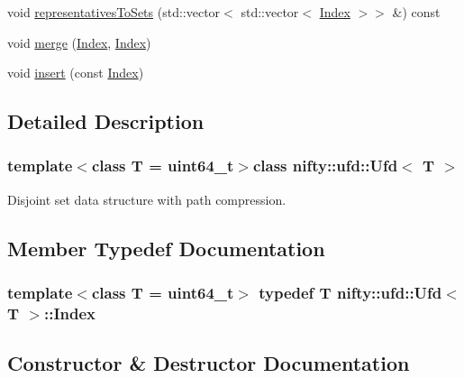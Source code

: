 \begin{DoxyCompactItemize}
\item 
void \hyperlink{classnifty_1_1ufd_1_1Ufd_af8d63d613aa1eb6efcd9770d9df0175c}{representatives\+To\+Sets} (std\+::vector$<$ std\+::vector$<$ \hyperlink{classnifty_1_1ufd_1_1Ufd_a0a9a7ab02b6d77fb2035234cbda8b3a7}{Index} $>$$>$ \&) const 
\item 
void \hyperlink{classnifty_1_1ufd_1_1Ufd_aeb49fa316c1956ce636e68e96e003d2f}{merge} (\hyperlink{classnifty_1_1ufd_1_1Ufd_a0a9a7ab02b6d77fb2035234cbda8b3a7}{Index}, \hyperlink{classnifty_1_1ufd_1_1Ufd_a0a9a7ab02b6d77fb2035234cbda8b3a7}{Index})
\item 
void \hyperlink{classnifty_1_1ufd_1_1Ufd_a89f525ed27ef959ff30666daa13741fe}{insert} (const \hyperlink{classnifty_1_1ufd_1_1Ufd_a0a9a7ab02b6d77fb2035234cbda8b3a7}{Index})
\end{DoxyCompactItemize}


\subsection{Detailed Description}
\subsubsection*{template$<$class T = uint64\+\_\+t$>$class nifty\+::ufd\+::\+Ufd$<$ T $>$}

Disjoint set data structure with path compression. 

\subsection{Member Typedef Documentation}
\hypertarget{classnifty_1_1ufd_1_1Ufd_a0a9a7ab02b6d77fb2035234cbda8b3a7}{}
\subsubsection[{Index}]{\setlength{\rightskip}{0pt plus 5cm}template$<$class T = uint64\+\_\+t$>$ typedef T {\bf nifty\+::ufd\+::\+Ufd}$<$ T $>$\+::{\bf Index}}\label{classnifty_1_1ufd_1_1Ufd_a0a9a7ab02b6d77fb2035234cbda8b3a7}


\subsection{Constructor \& Destructor Documentation}
\hypertarget{classnifty_1_1ufd_1_1Ufd_aab82fff1e159408a465bee8547f67358}{}
